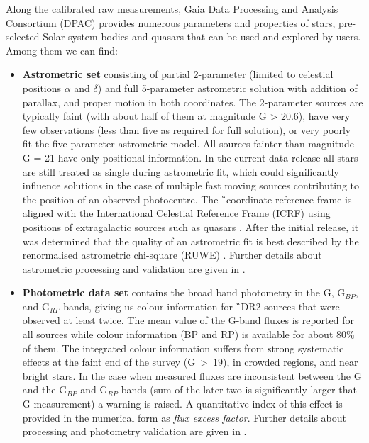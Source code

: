 Along the calibrated raw measurements, Gaia Data Processing and Analysis Consortium (DPAC) provides numerous parameters and properties of stars, pre-selected Solar system bodies and quasars that can be used and explored by users. Among them we can find:
\begin{itemize}
	\item \textbf{Astrometric set} consisting of partial 2-parameter (limited to celestial positions $\alpha$ and $\delta$) and full 5-parameter astrometric solution with addition of parallax, and proper motion in both coordinates. The 2-parameter sources are typically faint (with about half of them at magnitude G > 20.6), have very few observations (less than five as required for full solution), or very poorly fit the five-parameter astrometric model. All sources fainter than magnitude G = 21 have only positional information. In the current data release all stars are still treated as single during astrometric fit, which could significantly influence solutions in the case of multiple fast moving sources contributing to the position of an observed photocentre. The \G\ coordinate reference frame is aligned with the International Celestial Reference Frame (ICRF) using positions of extragalactic sources such as quasars \citep{2018A&A...616A..14G}. After the initial release, it was determined that the quality of an astrometric fit is best described by the renormalised astrometric chi-square (RUWE) \citep{ruwe}. Further details about astrometric processing and validation are given in \citet{2018A&A...616A...2L, 2018A&A...616A...9L}.
	
	\item \textbf{Photometric data set} contains the broad band photometry in the G, G$_{BP}$, and G$_{RP}$ bands, giving us colour information for \G\ DR2 sources that were observed at least twice. The mean value of the G-band fluxes is reported for all sources while colour information (BP and RP) is available for about 80$\%$ of them.	The integrated colour information suffers from strong systematic effects at the faint end of the survey (G~>~$19$), in crowded regions, and near bright stars. In the case when measured fluxes are inconsistent between the G and the G$_{BP}$ and G$_{RP}$ bands (sum of the later two is significantly larger that G measurement) a warning is raised. A quantitative index of this effect is provided in the numerical form as \textit{flux excess factor}. Further details about processing and photometry validation are given in \citet{2018A&A...616A...4E, 2018A&A...616A...3R}.
	

\end{itemize}
